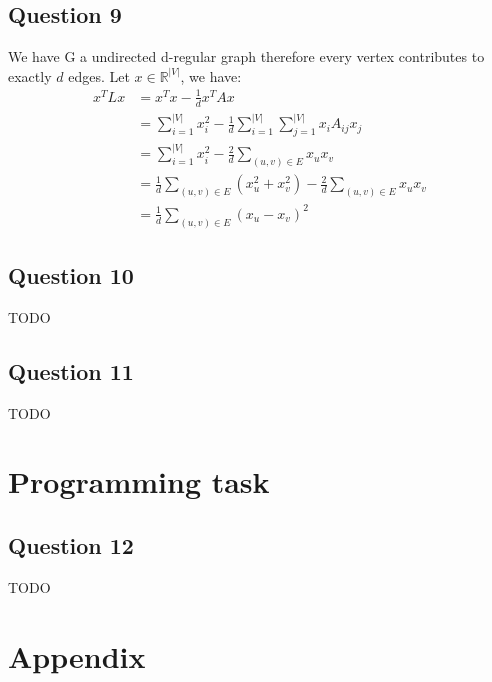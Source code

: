 \documentclass{article}
\begin{document}
\subsection{Question 9}
We have G a undirected d-regular graph therefore every vertex contributes to exactly $d$ edges.
Let $x \in \mathbb{R}^{|V|}$, we have:
\begin{align*}
  x^T L x & = x^T x - \frac{1}{d} x^T A x                                                             \\
          & = \sum_{i=1}^{|V|} x_i^2 - \frac{1}{d} \sum_{i=1}^{|V|} \sum_{j=1}^{|V|} x_i A_{ij} x_j   \\
          & = \sum_{i=1}^{|V|} x_i^2 - \frac{2}{d} \sum_{(u,v) \in E} x_u x_v                         \\
          & = \frac{1}{d} \sum_{(u,v) \in E} (x_u^2 + x_v^2) - \frac{2}{d} \sum_{(u,v) \in E} x_u x_v \\
          & = \frac{1}{d} \sum_{(u,v) \in E} (x_u - x_v)^2
\end{align*}

\subsection{Question 10}
TODO

\subsection{Question 11}
TODO

\section{Programming task}

\subsection{Question 12}
TODO

\newpage
\appendix

\section{Appendix}
\end{document}
